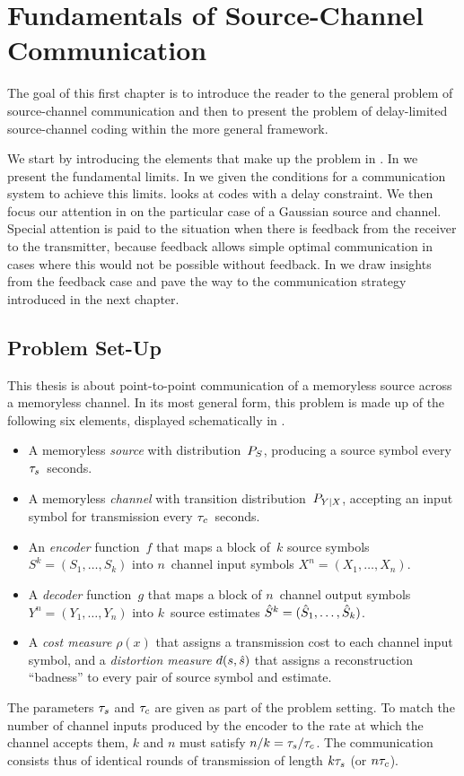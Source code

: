 \chapter{Fundamentals of Source-Channel Communication}\label{ch:fundamentals}

The goal of this first chapter is to introduce the reader to the general problem
of source-channel communication and then to present the problem of delay-limited
source-channel coding within the more general framework.

We start by introducing the elements that make up the problem in
. In  we present the fundamental limits.
In  we given the conditions for a communication system to
achieve this limits.  looks at codes with a delay
constraint. We then focus our attention in  on the particular
case of a Gaussian source and channel. Special attention is paid to the
situation when there is feedback from the receiver to the transmitter, because
feedback allows simple optimal communication in cases where this would not be
possible without feedback. In  we draw insights from
the feedback case and pave the way to the communication strategy introduced in
the next chapter. 


\section{Problem Set-Up}\label{sec:setup}

This thesis is about point-to-point communication of a memoryless source across
a memoryless channel. In its most general form, this problem is made up of the
following six elements, displayed schematically in .
\begin{itemize}
  \item A memoryless \emph{source} with distribution~${P_S}$, producing a source
    symbol every ${\tau_s}$~seconds.
  \item A memoryless \emph{channel} with transition distribution~$P_{Y|X}$,
    accepting an input symbol for transmission every ${\tau_c}$~seconds.
  \item An \emph{encoder} function~$f$ that maps a block of~$k$ source symbols
    $S^k = (S_1, \dots, S_k)$ into $n$~channel input symbols $X^n = (X_1, \dots,
    X_n)$.
  \item A \emph{decoder} function~$g$ that maps a block of $n$~channel output
    symbols $Y^n = (Y_1, \dots, Y_n)$ into $k$~source estimates ${\hat{S}}^k = ({\hat{S}}_1,
    \dots, {\hat{S}}_k)$.
  \item A \emph{cost measure} $\rho(x)$ that assigns a transmission cost to each
    channel input symbol, and a \emph{distortion measure} $d(s,{\hat{s}})$ that
    assigns a reconstruction ``badness'' to every pair of source symbol and
    estimate.
\end{itemize}
The parameters ${\tau_s}$ and ${\tau_c}$ are given as part of the problem
setting. To match the number of channel inputs produced by the encoder to the
rate at which the channel accepts them, $k$ and $n$ must satisfy $n/k = {\tau_s} /
{\tau_c}$. The communication consists thus of identical rounds of transmission of
length $k{\tau_s}$ (or $n{\tau_c}$).


